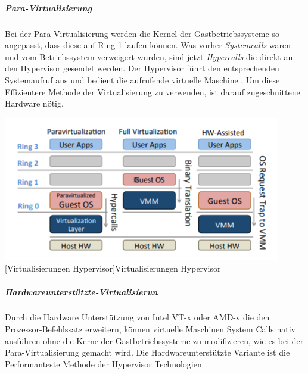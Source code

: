  \subparagraph{Para-Virtualisierung}
 Bei der Para-Virtualisierung werden die Kernel der Gastbetriebssysteme so angepasst, dass diese auf Ring 1 laufen können. Was vorher \emph{Systemcalls} waren und vom Betriebssystem verweigert wurden, sind jetzt \emph{Hypercalls} die direkt an den Hypervisor gesendet werden. Der Hypervisor führt den entsprechenden Systemaufruf aus und bedient die aufrufende virtuelle Maschine \cite{Meinel2011VirtualisierungMarktubersicht}. Um diese Effizientere Methode der Virtualisierung zu verwenden, ist darauf zugeschnittene Hardware nötig.

\vspace{1em}
\begin{minipage}{\linewidth}
	\centering
	\includegraphics[width=1\linewidth]{pics/Virtualisierungen_Hypervisor.PNG}
	[Virtualisierungen Hypervisor]{Virtualisierungen Hypervisor \cite{Fayyad-Kazan2013BenchmarkingHypervisors}}
	\label{fig:Virtualisierungen_Hypervisor}
\end{minipage}
 
\subparagraph{Hardwareunterstützte-Virtualisierun}
Durch die Hardware Unterstützung von Intel VT-x\cite{TechnologyIntel} oder AMD-v\cite{AMDVirtualisierungstechnologie} die den Prozessor-Befehlssatz erweitern, können virtuelle Maschinen System Calls nativ ausführen ohne die Kerne der Gastbetriebssysteme zu modifizieren, wie es bei der Para-Virtualisierung gemacht wird. Die Hardwareunterstützte Variante ist die Performanteste Methode der Hypervisor Technologien \cite{Meinel2011VirtualisierungMarktubersicht}.




